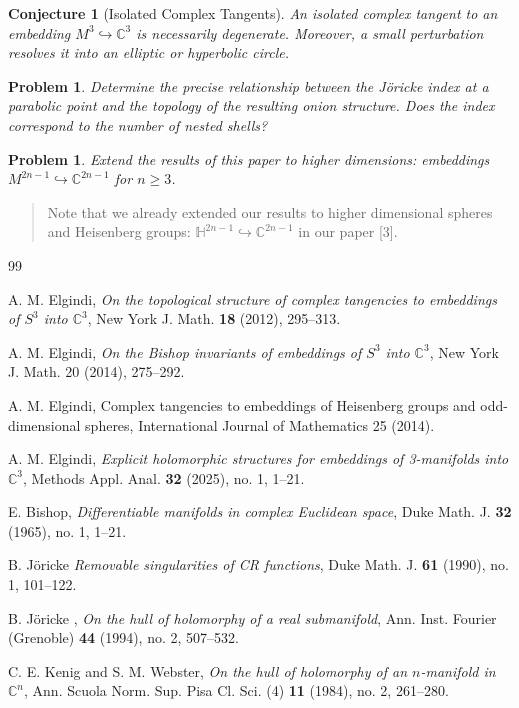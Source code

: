 \documentclass{amsart}
\newtheorem{conjecture}[theorem]{Conjecture}
\newtheorem{problem}[theorem]{Problem}
\newcommand{\C}{\mathbb{C}}
\begin{document}
\begin{conjecture}[Isolated Complex Tangents]
An isolated complex tangent to an embedding $M^3 \hookrightarrow \C^3$ is necessarily degenerate. Moreover, a small perturbation resolves it into an elliptic or hyperbolic circle.
\end{conjecture}

\begin{problem}
Determine the precise relationship between the Jöricke index at a parabolic point and the topology of the resulting onion structure. Does the index correspond to the number of nested shells?
\end{problem}

\begin{problem}
Extend the results of this paper to higher dimensions: embeddings $M^{2n-1} \hookrightarrow \C^{2n-1}$ for $n \geq 3$.
\end{problem}
\begin{quote}
    
\end{quote}
\begin{quote}
    Note that we already extended our results to higher dimensional spheres and Heisenberg groups: $\mathbb{H}^{2n-1} \hookrightarrow \mathbb{C}^{2n-1}$ in our paper [3].
\end{quote}
\newpage

\begin{thebibliography}{99}

A. M. Elgindi,
\textit{On the topological structure of complex tangencies to embeddings of $S^3$ into $\mathbb{C}^3$},
New York J. Math. \textbf{18} (2012), 295–313.

A. M. Elgindi, 
\textit{On the Bishop invariants of embeddings of $S^3$ into $\mathbb{C}^3$}, New York J. Math. 20 (2014), 275–292.


A. M. Elgindi, 
{Complex tangencies to embeddings of Heisenberg groups and odd-dimensional spheres}, International Journal of Mathematics 25 (2014). 

A. M. Elgindi,
\textit{Explicit holomorphic structures for embeddings of 3-manifolds into $\C^3$},
Methods Appl. Anal. \textbf{32} (2025), no. 1, 1–21.


E. Bishop,
\textit{Differentiable manifolds in complex Euclidean space},
Duke Math. J. \textbf{32} (1965), no. 1, 1–21.

B.  Jöricke 
\textit{Removable singularities of CR functions},
Duke Math. J. \textbf{61} (1990), no. 1, 101–122.

B. Jöricke ,
\textit{On the hull of holomorphy of a real submanifold},
Ann. Inst. Fourier (Grenoble) \textbf{44} (1994), no. 2, 507–532.

C. E. Kenig and S. M. Webster,
\textit{On the hull of holomorphy of an $n$-manifold in $\C^n$},
Ann. Scuola Norm. Sup. Pisa Cl. Sci. (4) \textbf{11} (1984), no. 2, 261–280.

\end{thebibliography}
\end{document}
